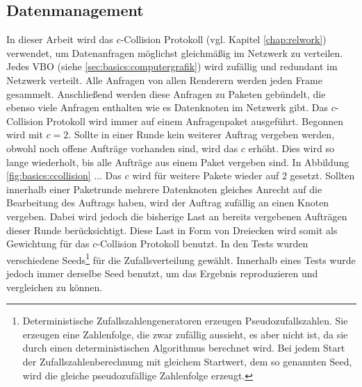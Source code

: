 \subsection{Datenmanagement}
\label{sec:basics:daten}
In dieser Arbeit wird das $c$-Collision Protokoll (vgl. Kapitel \ref{chap:relwork}) verwendet, um Datenanfragen möglichst gleichmäßig im Netzwerk zu verteilen. Jedes VBO (siehe \ref{sec:basics:computergrafik}) wird zufällig und redundant im Netzwerk verteilt. Alle Anfragen von allen Renderern werden jeden Frame gesammelt. Anschließend werden diese Anfragen zu Paketen gebündelt, die ebenso viele Anfragen enthalten wie es Datenknoten im Netzwerk gibt. Das $c$-Collision Protokoll wird immer auf einem Anfragenpaket ausgeführt. Begonnen wird mit $c = 2$. Sollte in einer Runde kein weiterer Auftrag vergeben werden, obwohl noch offene Aufträge vorhanden sind, wird das $c$ erhöht. Dies wird so lange wiederholt, bis alle Aufträge aus einem Paket vergeben sind. In Abbildung \ref{fig:basics:ccollision} ... Das $c$ wird für weitere Pakete wieder auf 2 gesetzt. Sollten innerhalb einer Paketrunde mehrere Datenknoten gleiches Anrecht auf die Bearbeitung des Auftrags haben, wird der Auftrag zufällig an einen Knoten vergeben. Dabei wird jedoch die bisherige Last an bereits vergebenen Aufträgen dieser Runde berücksichtigt. Diese Last in Form von Dreiecken wird somit als Gewichtung für das $c$-Collision Protokoll benutzt. In den Tests wurden verschiedene Seeds\footnote{Deterministische Zufallszahlengeneratoren erzeugen Pseudozufallszahlen. Sie erzeugen eine Zahlenfolge, die zwar zufällig aussieht, es aber nicht ist, da sie durch einen deterministischen Algorithmus berechnet wird. Bei jedem Start der Zufallszahlenberechnung mit gleichem Startwert, dem so genannten Seed, wird die gleiche pseudozufällige Zahlenfolge erzeugt.} für die Zufallsverteilung gewählt. Innerhalb eines Tests wurde jedoch immer derselbe Seed benutzt, um das Ergebnis reproduzieren und vergleichen zu können.
